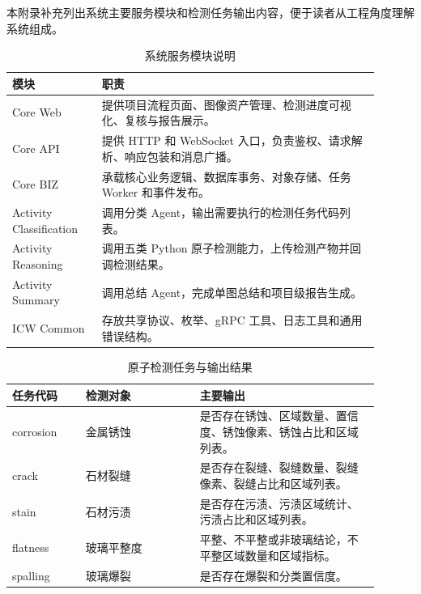 \label{sec:appendix-module}

本附录补充列出系统主要服务模块和检测任务输出内容，便于读者从工程角度理解系统组成。


\begin{table}[!htb]
  \caption{系统服务模块说明}\label{tab:service-modules}
  \centering
  \begin{tabular}{@{}p{0.22\linewidth}p{0.68\linewidth}@{}} \toprule
    \textbf{模块} & \textbf{职责} \\ \midrule
    Core Web & 提供项目流程页面、图像资产管理、检测进度可视化、复核与报告展示。 \\
    Core API & 提供 HTTP 和 WebSocket 入口，负责鉴权、请求解析、响应包装和消息广播。 \\
    Core BIZ & 承载核心业务逻辑、数据库事务、对象存储、任务 Worker 和事件发布。 \\
    Activity Classification & 调用分类 Agent，输出需要执行的检测任务代码列表。 \\
    Activity Reasoning & 调用五类 Python 原子检测能力，上传检测产物并回调检测结果。 \\
    Activity Summary & 调用总结 Agent，完成单图总结和项目级报告生成。 \\
    ICW Common & 存放共享协议、枚举、gRPC 工具、日志工具和通用错误结构。 \\ \bottomrule
  \end{tabular}
\end{table}


\begin{table}[!htb]
  \caption{原子检测任务与输出结果}\label{tab:detection-tasks}
  \centering
  \begin{tabular}{@{}p{0.18\linewidth}p{0.28\linewidth}p{0.44\linewidth}@{}} \toprule
    \textbf{任务代码} & \textbf{检测对象} & \textbf{主要输出} \\ \midrule
    corrosion & 金属锈蚀 & 是否存在锈蚀、区域数量、置信度、锈蚀像素、锈蚀占比和区域列表。 \\
    crack & 石材裂缝 & 是否存在裂缝、裂缝数量、裂缝像素、裂缝占比和区域列表。 \\
    stain & 石材污渍 & 是否存在污渍、污渍区域统计、污渍占比和区域列表。 \\
    flatness & 玻璃平整度 & 平整、不平整或非玻璃结论，不平整区域数量和区域指标。 \\
    spalling & 玻璃爆裂 & 是否存在爆裂和分类置信度。 \\ \bottomrule
  \end{tabular}
\end{table}
